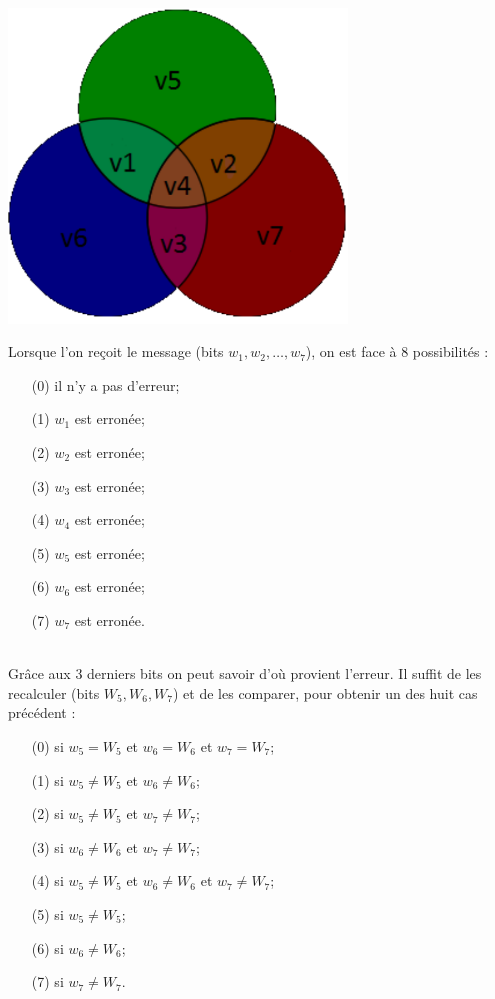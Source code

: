 \linebreak
\\
\includegraphics[width=9cm]{cercles.PNG}


Lorsque l'on reçoit le message (bits $w_1, w_2, \ldots, w_7$), on est face à 8 possibilités :

\begin{enumerate}
  \item[(0)] il n'y a pas d'erreur;
  \item[(1)] $w_1$ est erronée;
  \item[(2)] $w_2$ est erronée;
  \item[(3)] $w_3$ est erronée;
  \item[(4)] $w_4$ est erronée;
  \item[(5)] $w_5$ est erronée;
  \item[(6)] $w_6$ est erronée;
  \item[(7)] $w_7$ est erronée.
\end{enumerate}

\\ Grâce aux 3 derniers bits on peut savoir d'où provient l'erreur. Il suffit de les recalculer (bits $W_5, W_6, W_7$) et de les comparer, pour obtenir un des huit cas précédent :

\begin{enumerate}
  \item[(0)] si $w_5 = W_5$ et $w_6 = W_6$ et $w_7 = W_7$;
  \item[(1)] si $w_5 \ne W_5$ et $w_6 \ne W_6$;
  \item[(2)] si $w_5 \ne W_5$ et $w_7 \ne W_7$;
  \item[(3)] si $w_6 \ne W_6$ et $w_7 \ne W_7$;
  \item[(4)] si $w_5 \ne W_5$ et $w_6 \ne W_6$ et $w_7 \ne W_7$;
  \item[(5)] si $w_5 \ne W_5$;
  \item[(6)] si $w_6 \ne W_6$;
  \item[(7)] si $w_7 \ne W_7$.
\end{enumerate}

